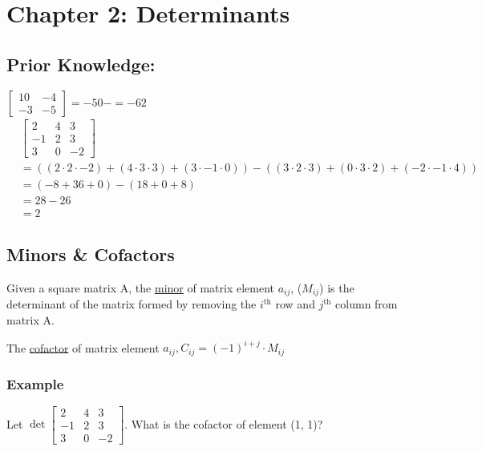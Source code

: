 \documentclass[
  letterpaper,
  DIV=11,
  numbers=noendperiod]{scrartcl}
\begin{document}
\hypertarget{chapter-2-determinants}{%
\section{Chapter 2: Determinants}\label{chapter-2-determinants}}

\hypertarget{prior-knowledge}{%
\subsection{Prior Knowledge:}\label{prior-knowledge}}

\(\begin{bmatrix}10 & -4 \\ -3 & -5 \end{bmatrix}=-50-=-62\)
\begin{align*}
&\begin{bmatrix}2 & 4 & 3 \\ -1 & 2 & 3 \\ 3 & 0 & -2 \end{bmatrix} \\
&= ((2\cdot2\cdot-2) + (4\cdot3\cdot3)+(3\cdot-1\cdot0))-((3\cdot2\cdot3)+(0\cdot3\cdot2)+(-2\cdot-1\cdot4)) \\
&= (-8+36+0)-(18+0+8) \\
&= 28-26 \\
&= 2
\end{align*}

\hypertarget{minors-cofactors}{%
\subsection{Minors \& Cofactors}\label{minors-cofactors}}

Given a square matrix A, the \ul{minor} of matrix element \(a_{ij}\),
(\(M_{ij}\)) is the determinant of the matrix formed by removing the
\(i^{\text{th}}\) row and \(j^{\text{th}}\) column from matrix A.

The \ul{cofactor} of matrix element
\(a_{ij}, C_{ij}=(-1)^{i+j}\cdot M_{ij}\)

\hypertarget{example}{%
\subsubsection{Example}\label{example}}

Let \(\det\begin{bmatrix}2&4&3 \\ -1&2&3 \\ 3&0&-2\end{bmatrix}\). What
is the cofactor of element (1, 1)?
\end{document}
